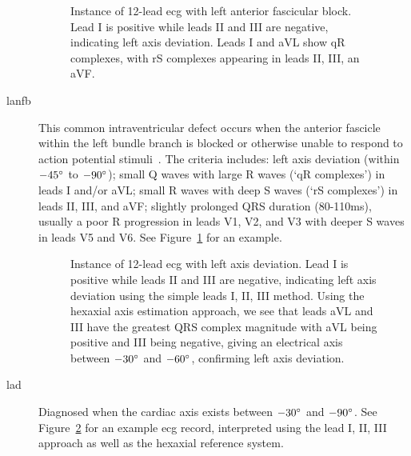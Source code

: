 \documentclass[\main/thesis.tex]{subfiles}
\begin{document}
\begin{description}
    \begin{figure}[ht]
        \centering
        \caption{Instance of 12-lead \gls{ecg} with left anterior fascicular block. Lead I is positive while leads II and III are negative, indicating left axis deviation. Leads I and aVL show qR complexes, with rS complexes appearing in leads II, III, an aVF.}
        \label{fig:full_LAnFB}
    \end{figure} 
    \item[\gls{lanfb}] This common intraventricular defect occurs when the anterior fascicle within the left bundle branch is blocked or otherwise unable to respond to action potential stimuli~\cite{ecg-utah-lesson}. The criteria includes: left axis deviation (within $-45\degree$ to $-90\degree$); small Q waves with large R waves (`qR complexes') in leads I and/or aVL; small R waves with deep S waves (`rS complexes') in leads II, III, and aVF; slightly prolonged QRS duration (80-110ms), usually a poor R progression in leads V1, V2, and V3 with deeper S waves in leads V5 and V6. See Figure~\ref{fig:full_LAnFB} for an example.

    \begin{figure}[ht]
        \centering
        \caption{Instance of 12-lead \gls{ecg} with left axis deviation. Lead I is positive while leads II and III are negative, indicating left axis deviation using the simple leads I, II, III method. Using the hexaxial axis estimation approach, we see that leads aVL and III have the greatest QRS complex magnitude with aVL being positive and III being negative, giving an electrical axis between $-30\degree$ and $-60\degree$, confirming left axis deviation.}
        \label{fig:full_LAD}
    \end{figure}
    \item[\gls{lad}] Diagnosed when the cardiac axis exists between $-30\degree$ and $-90\degree$. See Figure~\ref{fig:full_LAD} for an example \gls{ecg} record, interpreted using the lead I, II, III approach as well as the hexaxial reference system.


\end{description}
\end{document}

